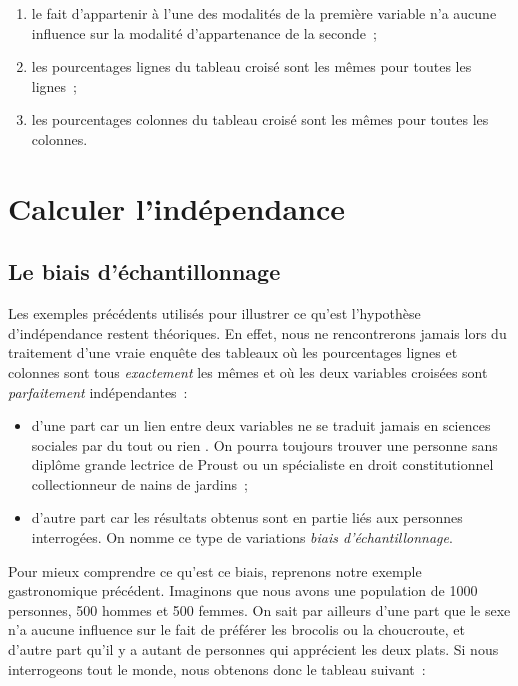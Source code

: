 \documentclass[a4paper,10pt,twoside,francais]{report}
\begin{document}
\begin{enumerate}
\item le fait d'appartenir à l'une des modalités de la première
  variable n'a aucune influence sur la modalité d'appartenance de la seconde~;
\item les pourcentages lignes du tableau croisé sont les mêmes pour
  toutes les lignes~;
\item les pourcentages colonnes du tableau croisé sont les mêmes pour
  toutes les colonnes.
\end{enumerate}



\chapter{Calculer l'indépendance}
\label{sec-indepcalc}

\section{Le biais d'échantillonnage}
\label{ssec-biaisech}

Les exemples précédents utilisés pour illustrer ce qu'est l'hypothèse
d'indépendance restent théoriques. En effet, nous ne rencontrerons
jamais lors du traitement d'une vraie enquête des tableaux où les
pourcentages lignes et colonnes sont tous \textit{exactement} les
mêmes et où les deux variables croisées sont \textit{parfaitement}
indépendantes~:
\begin{itemize}
\item d'une part car un lien entre deux variables ne se traduit jamais
  en sciences sociales par du \og tout ou rien \fg{}. On pourra toujours
  trouver une personne sans diplôme grande lectrice de Proust ou un
  spécialiste en droit constitutionnel collectionneur de nains de
  jardins~;
\item d'autre part car les résultats obtenus sont en partie liés aux
  personnes interrogées. On nomme ce type de variations \textit{biais
    d'échantillonnage}.
\end{itemize}
  
Pour mieux comprendre ce qu'est ce biais, reprenons notre exemple
gastronomique précédent. Imaginons que nous avons une population de
1000 personnes, 500 hommes et 500 femmes. On sait par ailleurs d'une
part que le sexe n'a aucune influence sur le fait de préférer les
brocolis ou la choucroute, et d'autre part qu'il y a autant de
personnes qui apprécient les deux plats. Si nous interrogeons tout le
monde, nous obtenons donc le tableau suivant~:
\end{document}
